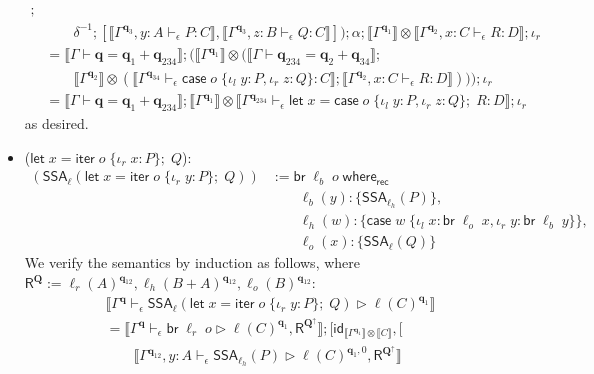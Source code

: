 \documentclass[acmsmall,screen,review]{acmart}
\newcommand{\mb}[1]{\ensuremath{\mathbf{#1}}}
\newcommand{\ms}[1]{\ensuremath{\mathsf{#1}}}
\newcommand{\lto}{:}
\newcommand{\linl}[1]{\iota_l\;{#1}}
\newcommand{\linr}[1]{\iota_r\;{#1}}
\newcommand{\letexpr}[3]{\ensuremath{\ms{let}\;#1 = #2;\;#3}}
\newcommand{\caseexpr}[5]{\ms{case}\;#1\;\{\linl{#2} \lto #3, \linr{#4} \lto #5\}}
\newcommand{\brb}[2]{\ms{br}\;#1\;#2}
\newcommand{\cwhere}[2]{#1\;\ms{where}_{\ms{rec}}\;#2}
\newcommand{\wbranch}[3]{#1(#2) \lto \{#3\}}
\newcommand{\liter}[3]{\ms{iter}\;#1\;\{ \linr{#2} \lto #3 \}}
\newcommand{\qsp}[4]{#1 \vdash #2 = #3 + #4}
\newcommand{\hasty}[4]{#1 \vdash_{#2} #3: {#4}}
\newcommand{\haslb}[4]{#1 \vdash_{#2} #3 \rhd #4}
\newcommand{\tossa}[2]{\ms{SSA}_{#1}(#2)}
\newcommand{\dnt}[1]{\llbracket{#1}\rrbracket}
\newcommand{\zeroqv}[1]{#1^\uparrow}
\begin{document}
\begin{itemize}
\begin{align*}
          ; \\ & \qquad \delta^{-1} ; [
          \dnt{\hasty{\Gamma^{\mb{q}_3}, y : A}{\epsilon}{P}{C}},
          \dnt{\hasty{\Gamma^{\mb{q}_3}, z : B}{\epsilon}{Q}{C}}
      ])
      ; \alpha
      ; \dnt{\Gamma^{\mb{q}_1}} \otimes \dnt{\hasty{\Gamma^{\mb{q}_2}, x : C}{\epsilon}{R}{D}}
      ; \iota_r
      \\
      &= \dnt{\qsp{\Gamma}{\mb{q}}{\mb{q}_{1}}{\mb{q}_{234}}}
      ; (\dnt{\Gamma^{\mb{q}_1}} \otimes (
          \dnt{\qsp{\Gamma}{\mb{q}_{234}}{\mb{q}_{2}}{\mb{q}_{34}}}  
          ; \\ & \qquad 
            \dnt{\Gamma^{\mb{q}_2}} 
            \otimes (\dnt{\hasty{\Gamma^{\mb{q}_{34}}}{\epsilon}{\caseexpr{o}{y}{P}{z}{Q}}{C}}
          ; \dnt{\hasty{\Gamma^{\mb{q}_2}, x : C}{\epsilon}{R}{D}}
      ))) 
      ; \iota_r
      \\
      &= \dnt{\qsp{\Gamma}{\mb{q}}{\mb{q}_{1}}{\mb{q}_{234}}}
      ; \dnt{\Gamma^{\mb{q}_1}} \otimes \dnt{
        \hasty{\Gamma^{\mb{q}_{234}}}{\epsilon}{\letexpr{x}{\caseexpr{o}{y}{P}{z}{Q}}{R}}{D}
      } ; \iota_r
  \end{align*}
  as desired.
  \item ($\letexpr{x}{\liter{o}{x}{P}}{Q}$): 
  \begin{align*}
    (\tossa{\ell}{\letexpr{x}{\liter{o}{y}{P}}{Q}})
    & := \cwhere{\brb{\ell_b}{o}}{ \\ & \qquad
      \wbranch{\ell_b}{y}{\tossa{\ell_h}{P}}, \\ & \qquad
      \wbranch{\ell_h}{w}{\caseexpr{w}{x}{\brb{\ell_o}{x}}{y}{\brb{\ell_b}{y}}}, \\ & \qquad
      \wbranch{\ell_o}{x}{\tossa{\ell}{Q}}
    }
  \end{align*}
  We verify the semantics by induction as follows, where $\ms{R}^{\mb{Q}} := 
  \ell_r(A)^{\mb{q}_{12}}, \ell_h(B + A)^{\mb{q}_{12}}, \ell_o(B)^{\mb{q}_{12}}$:
  \begin{align*}
  & \dnt{
    \haslb{\Gamma^{\mb{q}}}{\epsilon}{\tossa{\ell}{\letexpr{x}{\liter{o}{y}{P}}{Q}}}
    {\ell(C)^{\mb{q}_1}}
  } \\
  &= \dnt{\haslb{\Gamma^{\mb{q}}}{\epsilon}{\brb{\ell_r}{o}}
        { 
          \ell(C)^{\mb{q}_1}, 
          \ms{R}^{\zeroqv{\mb{Q}}}
        }
      } ; [\ms{id}_{\dnt{\Gamma^{\mb{q}_1}} \otimes \dnt{C}}, [\\ & \qquad
      \dnt{\haslb{\Gamma^{\mb{q}_{12}}, y : A}{\epsilon}{\tossa{\ell_h}{P}}
        {
          \ell(C)^{\mb{q}_1, 0}, 
          \ms{R}^{\zeroqv{\mb{Q}}}
}}
\end{align*}
\end{itemize}
\end{document}
